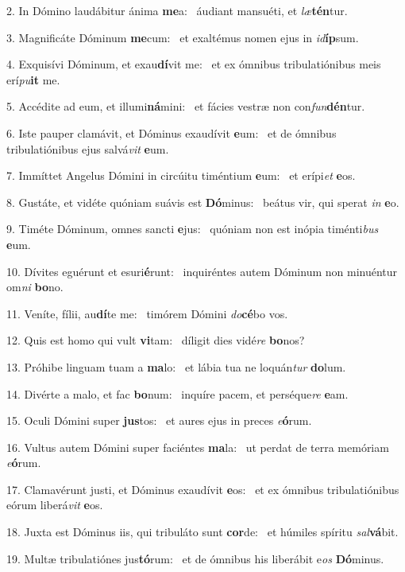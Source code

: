 2. In Dómino laudábitur ánima \textbf{me}a: \ast\  áudiant mansuéti, et \textit{læ}\textbf{tén}tur.\

3. Magnificáte Dóminum \textbf{me}cum: \ast\  et exaltémus nomen ejus in \textit{id}\textbf{íp}sum.\

4. Exquisívi Dóminum, et exau\textbf{dí}vit me: \ast\  et ex ómnibus tribulatiónibus meis erí\textit{pu}\textbf{it} me.\

5. Accédite ad eum, et illumi\textbf{ná}mini: \ast\  et fácies vestræ non con\textit{fun}\textbf{dén}tur.\

6. Iste pauper clamávit, et Dóminus exaudívit \textbf{e}um: \ast\  et de ómnibus tribulatiónibus ejus salvá\textit{vit} \textbf{e}um.\

7. Immíttet Angelus Dómini in circúitu timéntium \textbf{e}um: \ast\  et erípi\textit{et} \textbf{e}os.\

8. Gustáte, et vidéte quóniam suávis est \textbf{Dó}minus: \ast\  beátus vir, qui sperat \textit{in} \textbf{e}o.\

9. Timéte Dóminum, omnes sancti \textbf{e}jus: \ast\  quóniam non est inópia timénti\textit{bus} \textbf{e}um.\

10. Dívites eguérunt et esuri\textbf{é}runt: \ast\  inquiréntes autem Dóminum non minuéntur om\textit{ni} \textbf{bo}no.\

11. Veníte, fílii, au\textbf{dí}te me: \ast\  timórem Dómini \textit{do}\textbf{cé}bo vos.\

12. Quis est homo qui vult \textbf{vi}tam: \ast\  díligit dies vidé\textit{re} \textbf{bo}nos?\

13. Próhibe linguam tuam a \textbf{ma}lo: \ast\  et lábia tua ne loquán\textit{tur} \textbf{do}lum.\

14. Divérte a malo, et fac \textbf{bo}num: \ast\  inquíre pacem, et perséque\textit{re} \textbf{e}am.\

15. Oculi Dómini super \textbf{jus}tos: \ast\  et aures ejus in preces \textit{e}\textbf{ó}rum.\

16. Vultus autem Dómini super faciéntes \textbf{ma}la: \ast\  ut perdat de terra memóriam \textit{e}\textbf{ó}rum.\

17. Clamavérunt justi, et Dóminus exaudívit \textbf{e}os: \ast\  et ex ómnibus tribulatiónibus eórum liberá\textit{vit} \textbf{e}os.\

18. Juxta est Dóminus iis, qui tribuláto sunt \textbf{cor}de: \ast\  et húmiles spíritu \textit{sal}\textbf{vá}bit.\

19. Multæ tribulatiónes jus\textbf{tó}rum: \ast\  et de ómnibus his liberábit e\textit{os} \textbf{Dó}minus.\

